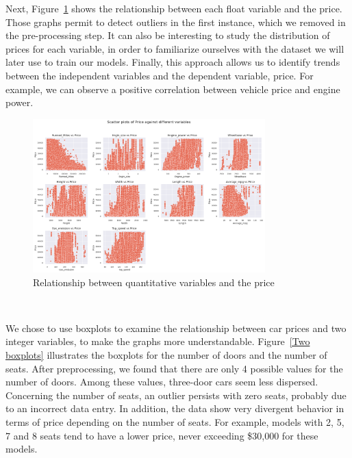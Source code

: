 \documentclass[12pt]{article}
\begin{document}
\noindent Next, Figure~\ref{Relationships} shows the relationship between each float variable and the price. Those graphs permit to detect outliers in the first instance, which we removed in the pre-processing step. It can also be interesting to study the distribution of prices for each variable, in order to familiarize ourselves with the dataset we will later use to train our models. Finally, this approach allows us to identify trends between the independent variables and the dependent variable, price. For example, we can observe a positive correlation between vehicle price and engine power.

\FloatBarrier
\begin{figure}[ht]
    \centering
    \includegraphics[width=0.8\textwidth]{numerique variables.png}
    \caption{Relationship between quantitative variables and the price}
    \label{Relationships}
\end{figure}
\\
\FloatBarrier

\noindent We chose to use boxplots to examine the relationship between car prices and two integer variables, to make the graphs more understandable. 
Figure~\ref{Two boxplots} illustrates the boxplots for the number of doors and the number of seats. 
After preprocessing, we found that there are only 4 possible values for the number of doors. Among these values, three-door cars seem less dispersed. Concerning the number of seats, an outlier persists with zero seats, probably due to an incorrect data entry. In addition, the data show very divergent behavior in terms of price depending on the number of seats. For example, models with 2, 5, 7 and 8 seats tend to have a lower price, never exceeding \$30,000 for these models.
\end{document}
